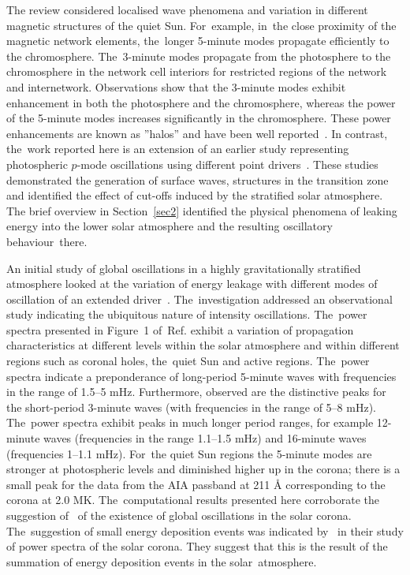\documentclass[physics,article,accept,pdftex,moreauthors]{Definitions/mdpi}
\begin{document}
The  {review} %
\cite{Khomenko2013} considered localised wave phenomena and variation in different magnetic structures of the 
 {quiet}  
Sun. For~example, in~the close proximity of the magnetic network elements, the~longer 5-minute modes propagate efficiently to the chromosphere. The~3-minute modes propagate from the photosphere to the chromosphere in the network cell interiors for restricted regions of the network and internetwork.  Observations show that the 3-minute modes exhibit enhancement in both the photosphere and the chromosphere, whereas the power of the 5-minute modes increases significantly in the chromosphere. These power enhancements are known as 
''halos'' and have been %
 {well}  
reported~\cite{Kontogiannis2010}. 
In contrast, the~work reported here is an extension of an earlier study representing photospheric $p$-mode oscillations using different point drivers~\cite{Malins2007}. These studies demonstrated  the generation of surface waves, structures in the transition zone and identified the effect of cut-offs induced by the stratified  solar atmosphere. The brief overview in Section~\ref{sec2} identified the physical phenomena of leaking energy into the lower solar atmosphere and the resulting oscillatory behaviour~there.

An initial study of global oscillations in a highly gravitationally stratified atmosphere looked at the variation of energy leakage with different modes of oscillation of an extended driver~\cite{Griffiths2018b}. The~investigation addressed an observational study indicating the ubiquitous nature of intensity oscillations. The~power spectra presented in 
 {Figure~1} %
of~{Ref.} 
\cite{Griffiths2018b} exhibit a variation of propagation characteristics at different levels within the solar atmosphere and within different regions such as coronal holes, 
the~{quiet} 
Sun and active regions. The~power spectra indicate a preponderance of long-period 5-minute waves with frequencies in the range of 1.5--5 mHz. Furthermore, observed are the distinctive peaks for the short-period 3-minute waves (with frequencies in the range of 5--8 mHz). The~power spectra exhibit  peaks in much longer period ranges, for example 12-minute waves  (frequencies in the range 1.1--1.5 mHz)  and 16-minute waves (frequencies 1--1.1 mHz). For~the 
 {quiet} 
Sun regions the 5-minute modes are stronger at photospheric levels and diminished higher up in the corona; there is a small peak for the data from the AIA passband at 211 {\AA} corresponding to the corona at 2.0 MK.  The~computational results presented here corroborate the suggestion of~\cite{Didkovsky2013} of the existence of global oscillations in the solar corona. The~suggestion of small energy deposition events was indicated by~\cite{Ireland2015} in their study of power spectra of the solar corona. They suggest that this is the result of the summation of energy deposition events in the solar~atmosphere.
\end{document}
